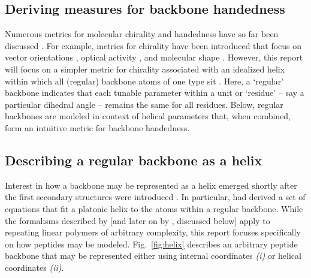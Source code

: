 \documentclass[fleqn,10pt,lineno]{wlpeerj} %
\newcommand{\n}[1]{{\color{black}#1}} %
\newcommand{\Fig}[1]{Fig.~\ref{#1}}
\begin{document}
\subsection*{Deriving measures for backbone handedness}
Numerous metrics for molecular chirality and handedness have so far been discussed \citep{Harris1999}. For example, metrics for chirality have been introduced that focus on vector orientations \citep{Kwiecinska2005,Kabsch1983,Gruziel2013}, optical activity \citep{Osipov1995}, and molecular shape \citep{Ferrarini1998}. However, this report will focus on a simpler metric for chirality associated with an idealized helix within which 
\n{all (regular) backbone atoms of one type sit} \citep{Shimanouchi1955,Miyazawa1961,Zacharias2013}. 
\n{Here, a `regular' backbone  indicates that each tunable parameter within a unit or `residue' -- say a particular dihedral angle -- remains the same for all residues. Below, regular backbones are modeled in context of helical parameters that, when combined, form an intuitive metric for backbone handedness.}

\subsection*{Describing a regular backbone as a helix} 
Interest in how a backbone may be represented as a helix emerged shortly after the first secondary structures were introduced \citep{Pauling1951,Pauling1951a,Pauling1951b}. In particular, \cite{Shimanouchi1955} had derived a set of equations that fit a platonic helix to the atoms within a regular backbone. 
\n{While the formalisms described by \cite{Shimanouchi1955} [and later on by \cite{Miyazawa1961}, discussed below] apply to repeating linear polymers of arbitrary complexity, %
this report focuses specifically on how peptides may be modeled.} \Fig{fig:helix} describes an arbitrary peptide backbone that may be represented either using internal coordinates \textit{(i)} or helical coordinates \textit{(ii)}. 
\end{document}

